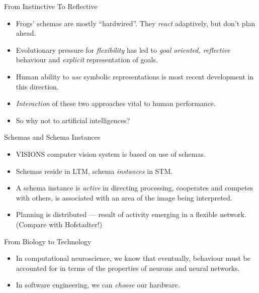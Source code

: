 \documentclass{article}
\begin{document}
\begin{slide}{}
{\Large From Instinctive To Reflective}
\begin{itemize}
\item Frogs' schemas are mostly ``hardwired''. They {\em react}
adaptively, but don't plan ahead.
\item Evolutionary pressure for {\em flexibility} has led to {\em goal
oriented, reflective} behaviour and {\em explicit} representation of
goals.
\item Human ability to {\em use} symbolic representations is most
recent development in this direction.
\item {\em Interaction} of these two approaches vital to human
performance.
\item So why not to artificial intelligences?
\end{itemize}
\end{slide}

\begin{slide}{}
{\Large Schemas and Schema Instances}
\begin{itemize}
\item VISIONS computer vision system is based on use of schemas.
\item Schemas reside in LTM, schema {\em instances} in STM.
\item A schema instance is {\em active} in directing processing,
cooperates and competes with others, is associated with an area of the
image being interpreted.
\item Planning is distributed --- result of activity emerging in a
flexible network. (Compare with Hofstadter!)
\end{itemize}
\end{slide}

\begin{slide}{}
{\Large From Biology to Technology}
\begin{itemize}
\item In computational neuroscience, we know that eventually,
behaviour must be accounted for in terms of the properties of neurons
and neural networks.
\item In software engineering, we can {\em choose}
our hardware.
\end{itemize}
\begin{center}


\end{center}
\end{slide}
\end{document}
